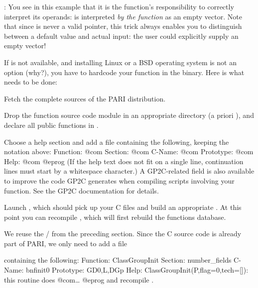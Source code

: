 : You see in this example that it is the
function's responsibility to correctly interpret its operands:  is interpreted \emph{by the function} as an empty vector. Note that
since  is never a valid  pointer, this trick always
enables you to distinguish between a default value and actual input: the
user could explicitly supply an empty vector!


If  is not available, and installing Linux or a BSD operating
system is not an option (why?), you have to hardcode your function in the
 binary. Here is what needs to be done:

\item Fetch the complete sources of the PARI distribution.

\item Drop the function source code module in an appropriate directory
(a priori ), and declare all public functions
in .

\item Choose a help section and add a file
containing the following, keeping the notation above:
\bprog
Function:  @com
Section:   @com
C-Name:    @com
Prototype: @com
Help:      @com
@eprog\noindent
(If the help text does not fit on a single line, continuation lines must
start by a whitespace character.) A GP2C-related  field
is also available to improve the code GP2C generates when compiling
scripts involving your function. See the GP2C documentation for details.

\item Launch , which should pick up your C files and build an
appropriate . At this point you can recompile , which
will first rebuild the functions database.

 We reuse the  / 
from the preceding section. Since the C source code is already part
of PARI, we only need to add a file


\noindent containing the following:
\bprog
Function: ClassGroupInit
Section: number_fields
C-Name: bnfinit0
Prototype: GD0,L,DGp
Help: ClassGroupInit(P,{flag=0},{tech=[]}): this routine does @com\dots
@eprog\noindent
and recompile .
\vfill\eject
